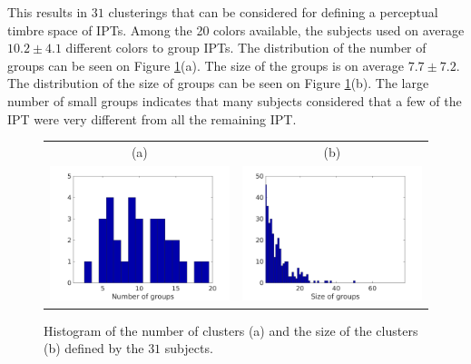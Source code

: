 \documentclass{bmcart}
\newcommand{\ipt}{IPT\xspace}
\newcommand{\ipts}{IPTs\xspace}
\begin{document}
\begin{backmatter}
This results in $31$ clusterings that can be considered for defining a perceptual timbre space of \ipts. Among the 20 colors available, the subjects used on average $10.2 \pm  4.1$ different colors to group \ipts. The distribution of the number of groups can be seen on Figure \ref{fig:xp2nbSize}(a). The size of the groups is on average $7.7 \pm   7.2$. The distribution of the size of groups can be seen on Figure \ref{fig:xp2nbSize}(b). The large number of small groups indicates that many subjects considered that a few of the \ipt were very different from all the remaining \ipt.

\begin{figure}
\center
\begin{tabular}{cc}
  (a) & (b) \\
  \includegraphics[width = \textwidth]{figures/nbc.png} &
  \includegraphics[width = \textwidth]{figures/sbc.png}
\end{tabular}
\caption{Histogram of the number of clusters (a) and the size of the clusters (b) defined by the $31$ subjects.}
\label{fig:xp2nbSize}
\end{figure}





\end{backmatter}
\end{document}
